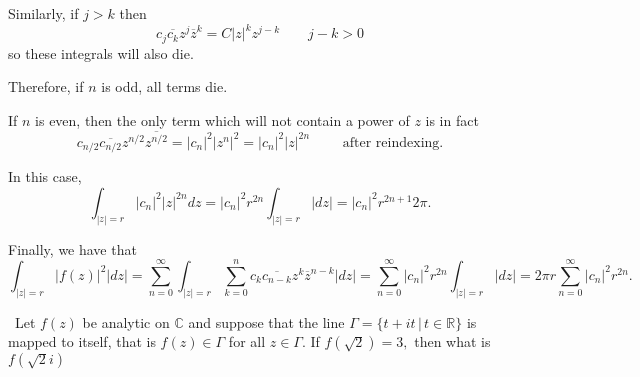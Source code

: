 \documentclass[12pt]{Homework}
\begin{document}
\begin{solution}
Similarly, if $j>k$ then $$c_j\overline{c_k}z^j\overline{z}^k=C|z|^kz^{j-k}\qquad j-k>0$$ so these integrals will also die.

Therefore, if $n$ is odd, all terms die.

If $n$ is even, then the only term which will not contain a power of $z$ is in fact $$c_{n/2}\overline{c_{n/2}}z^{n/2}\overline{z^{n/2}}=|c_n|^2|z^n|^2=|c_n|^2|z|^{2n}\qquad\text{ after reindexing}.$$

In this case, $$\int_{|z|=r}|c_n|^2|z|^{2n}dz=|c_n|^2r^{2n}\int_{|z|=r}|dz|=|c_n|^2r^{2n+1}2\pi.$$

Finally, we have that $$\int_{|z|=r}|f(z)|^2|dz|=\sum_{n=0}^\infty\int_{|z|=r}\sum_{k=0}^nc_k\overline{c_{n-k}}z^k\overline{z}^{n-k}|dz|=\sum_{n=0}^\infty|c_n|^2r^{2n}\int_{|z|=r}|dz|=2\pi r\sum_{n=0}^\infty|c_n|^2r^{2n}.$$
\end{solution}
\newpage

\begin{problem} $\,$
Let $f(z)$ be analytic on $\mathbb{C}$ and suppose that the line $\Gamma=\{t+it\,|\,t\in\mathbb{R}\}$ is mapped to itself, that is $f(z)\in\Gamma$ for all $z\in\Gamma$. If $f(\sqrt{2})=3,$ then what is $f(\sqrt{2}i)$
\end{problem}
\end{document}
